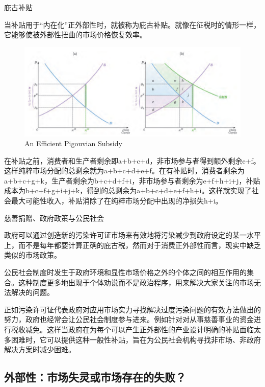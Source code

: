 \documentclass{article}
\begin{document}
庇古补贴

当补贴用于“内在化”正外部性时，就被称为庇古补贴。就像在征税时的情形一样，它能够使被外部性扭曲的市场价格恢复效率。

\begin{figure}[H] %
	\centering %
	\includegraphics[width=1\textwidth]{21_5} %
	\caption{An Efficient Pigouvian Subsidy} %
	\label{Fig.main6} %
\end{figure}

在补贴之前，消费者和生产者剩余即a+b+c+d，非市场参与者得到额外剩余e+f。这样纯粹市场分配的总剩余就为a+b+c+d+e+f。在有补贴时，消费者剩余为a+b+c+g+k，生产者剩余为b+c+d+f+i，非市场参与者剩余为e+f+h+i+j，补贴成本为b+c+f+g+i+j+k，得到的总剩余为a+b+c+d+e+f+h+i。这样就实现了社会最大可能性收入，补贴消除了在纯粹市场分配中出现的净损失h+i。

\hspace*{\fill}

慈善捐赠、政府政策与公民社会

政府可以通过创造新的污染许可证市场来有效地将污染减少到政府设定的某一水平上，而不是每年都要计算正确的庇古税，然而对于消费正外部性而言，现实中缺乏类似的市场政策。

公民社会制度时发生于政府环境和显性市场价格之外的个体之间的相互作用的集合。这种制度更多地出现于个体劝说而不是政治程序，用来解决大家关注的市场无法解决的问题。

正如污染许可证代表政府对应用市场实力寻找解决过度污染问题的有效方法做出的努力，政府也经常会让公民社会制度参与进来。例如针对对从事慈善事业的资金进行税收减免。这样当政府在为每个可以产生正外部性的产业设计明确的补贴面临太多困难时，它可以提供这种一般性补贴，旨在为公民社会机构寻找非市场、非政府解决方案时减少困难。

\hspace*{\fill}

\subsection{外部性：市场失灵或市场存在的失败？}
\end{document}
